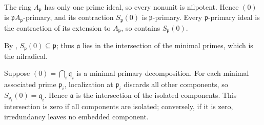 The ring $A_{\mathfrak{p}}$ has only one prime ideal, so every nonunit is nilpotent. Hence $(0)$ is $\mathfrak{p}A_{\mathfrak{p}}$-primary, and its contraction $S_{\mathfrak{p}}(0)$ is $\mathfrak{p}$-primary. Every $\mathfrak{p}$-primary ideal is the contraction of its extension to $A_{\mathfrak{p}}$, so contains $S_{\mathfrak{p}}(0)$.

By , $S_{\mathfrak{p}}(0)\subseteq\mathfrak{p}$; thus $\mathfrak{a}$ lies in the intersection of the minimal primes, which is the nilradical.

Suppose $(0)=\bigcap_i\mathfrak{q}_i$ is a minimal primary decomposition. For each minimal associated prime $\mathfrak{p}_i$, localization at $\mathfrak{p}_i$ discards all other components, so $S_{\mathfrak{p}_i}(0)=\mathfrak{q}_i$. Hence $\mathfrak{a}$ is the intersection of the isolated components. This intersection is zero if all components are isolated; conversely, if it is zero, irredundancy leaves no embedded component.
